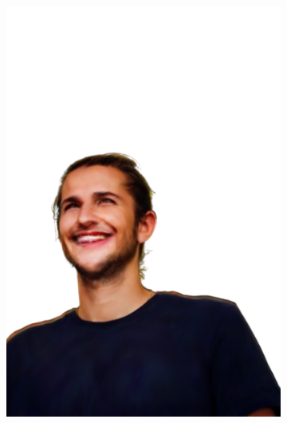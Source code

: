 \begin{figure}[ht]
\begin{subfigure}{0.2\linewidth}
		\includegraphics[width=\textwidth]{Figures/failed/smile/5_render-removebg-preview.png}
	\end{subfigure}
	\begin{subfigure}{0.2\linewidth}

\end{subfigure}
\end{figure}
